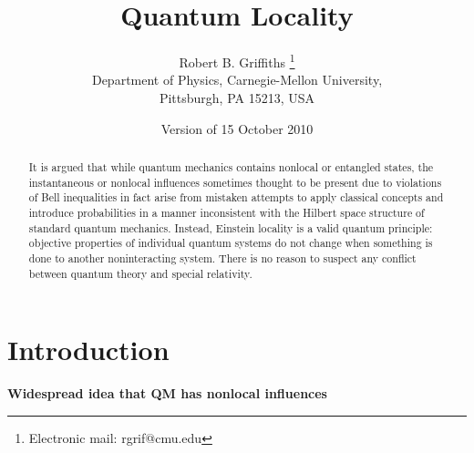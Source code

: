 \documentclass[10pt]{article} %
\def\outl#1{\par{\medskip\noindent\hspace*{.5cm}\bf
      \mathversion{bold}#1\mathversion{normal}\smallskip} }
\def\np{} \def\xa{} \def\xb{} \def\xn{} \def\xp{}
\def\outl#1{} \def\np{} \def\xa{} \def\xb{} \def\xn{} \def\xp{}
\def\outl#1{\par{\medskip\noindent\hspace*{.5cm}\bf
      \mathversion{bold}#1\mathversion{normal}\smallskip} }
\def\np{\newpage }\def\xn{\nopagebreak }\def\xp{\pagebreak }
\begin{document}
\title{Quantum Locality}

\author{Robert B. Griffiths
\thanks{Electronic mail: rgrif@cmu.edu}\\ 
Department of Physics,
Carnegie-Mellon University,\\
Pittsburgh, PA 15213, USA}

\date{Version of 15 October 2010}

\maketitle

\xa
\begin{abstract}
 
  It is argued that while quantum mechanics contains nonlocal or entangled
  states, the instantaneous or nonlocal influences sometimes thought to be
  present due to violations of Bell inequalities in fact arise from mistaken
  attempts to apply classical concepts and introduce probabilities in a manner
  inconsistent with the Hilbert space structure of standard quantum mechanics.
  Instead, Einstein locality is a valid quantum principle:
  objective properties of individual quantum systems do not change when
  something is done to another noninteracting system.  There is no reason to
  suspect any conflict between quantum theory and special relativity.

\end{abstract}

\xb

	\section{Introduction}
\label{sct1}
\xa

\xb
\outl{Widespread idea that QM has nonlocal influences}
\xa
\end{document}
